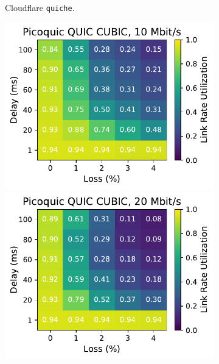 \begin{figure}[ht]
\begin{subfigure}[b]{0.22\linewidth}
        \caption{Cloudflare \texttt{quiche}.}
    \end{subfigure}
    \begin{subfigure}[b]{0.22\linewidth}
        \includegraphics[width=\linewidth,trim={0 0 2cm 0},clip]{figures/heatmaps/heatmap_picoquic_cubic_10mbps.pdf}
        \includegraphics[width=\linewidth,trim={0 0 2cm 0},clip]{figures/heatmaps/heatmap_picoquic_cubic_20mbps.pdf}

\end{subfigure}
\end{figure}
